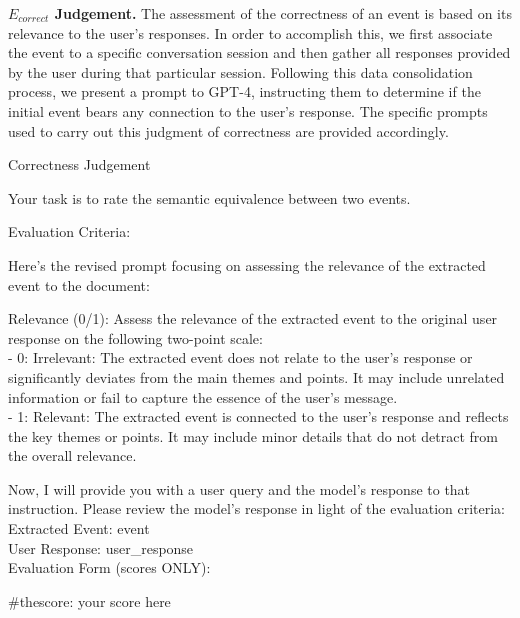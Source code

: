 \noindent\textbf{$E_{correct}$ Judgement.} The assessment of the correctness of an event is based on its relevance to the user's responses. In order to accomplish this, we first associate the event to a specific conversation session and then gather all responses provided by the user during that particular session. Following this data consolidation process, we present a prompt to GPT-4, instructing them to determine if the initial event bears any connection to the user's response. The specific prompts used to carry out this judgment of correctness are provided accordingly.

\begin{mybox}{Correctness Judgement}

Your task is to rate the semantic equivalence between two events.

Evaluation Criteria:

Here's the revised prompt focusing on assessing the relevance of the extracted event to the document:

Relevance (0/1): Assess the relevance of the extracted event to the original user response on the following two-point scale:\\
- 0: Irrelevant: The extracted event does not relate to the user's response or significantly deviates from the main themes and points. It may include unrelated information or fail to capture the essence of the user's message.\\
- 1: Relevant: The extracted event is connected to the user's response and reflects the key themes or points. It may include minor details that do not detract from the overall relevance.

Now, I will provide you with a user query and the model's response to that instruction. Please review the model's response in light of the evaluation criteria:\\
Extracted Event: {event}\\
User Response: {user\_response}\\

Evaluation Form (scores ONLY):

\#thescore: your score here    
\end{mybox}

